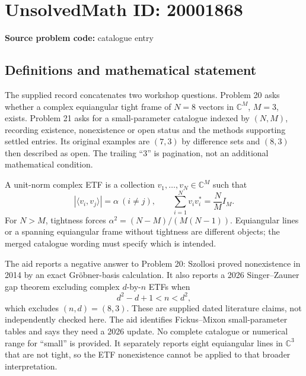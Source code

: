 \documentclass[11pt]{article}
\begin{document}
\section*{UnsolvedMath ID: 20001868}
\textbf{Source problem code:} catalogue entry
\subsection{Definitions and mathematical statement}
The supplied record concatenates two workshop questions. Problem 20 asks whether a complex equiangular tight frame of \(N=8\) vectors in \(\mathbb C^M\), \(M=3\), exists. Problem 21 asks for a small-parameter catalogue indexed by \((N,M)\), recording existence, nonexistence or open status and the methods supporting settled entries. Its original examples are \((7,3)\) by difference sets and \((8,3)\) then described as open. The trailing ``3'' is pagination, not an additional mathematical condition.

A unit-norm complex ETF is a collection \(v_1,\ldots,v_N\in\mathbb C^M\) such that
\[
 |\langle v_i,v_j\rangle|=\alpha\ (i\ne j),\qquad
 \sum_{i=1}^N v_iv_i^*=\frac NM I_M.
\]
For \(N>M\), tightness forces \(\alpha^2=(N-M)/(M(N-1))\). Equiangular lines or a spanning equiangular frame without tightness are different objects; the merged catalogue wording must specify which is intended.

The aid reports a negative answer to Problem 20: Szollosi proved nonexistence in 2014 by an exact Gr\"obner-basis calculation. It also reports a 2026 Singer--Zauner gap theorem excluding complex \(d\)-by-\(n\) ETFs when
\[
 d^2-d+1<n<d^2,
\]
which excludes \((n,d)=(8,3)\). These are supplied dated literature claims, not independently checked here. The aid identifies Fickus--Mixon small-parameter tables and says they need a 2026 update. No complete catalogue or numerical range for ``small'' is provided. It separately reports eight equiangular lines in \(\mathbb C^3\) that are not tight, so the ETF nonexistence cannot be applied to that broader interpretation.
\end{document}
